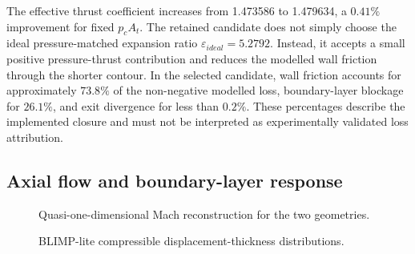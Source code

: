 The effective thrust coefficient increases from 1.473586 to 1.479634, a \(0.41\%\)
improvement for fixed \(p_cA_t\). The retained candidate does not simply choose the
ideal pressure-matched expansion ratio \(\varepsilon_{ideal}=5.2792\). Instead, it
accepts a small positive pressure-thrust contribution and reduces the modelled wall
friction through the shorter contour. In the selected candidate, wall friction
accounts for approximately \(73.8\%\) of the non-negative modelled loss, boundary-layer
blockage for \(26.1\%\), and exit divergence for less than \(0.2\%\). These percentages
describe the implemented closure and must not be interpreted as experimentally
validated loss attribution.

\subsection{Axial flow and boundary-layer response}

\begin{figure}[H]
\centering
{}
\caption{Quasi-one-dimensional Mach reconstruction for the two geometries.}
\label{fig:mach_comparison}
\end{figure}

\begin{figure}[H]
\centering
{}
\caption{BLIMP-lite compressible displacement-thickness distributions.}
\label{fig:displacement_thickness_comparison}
\end{figure}

